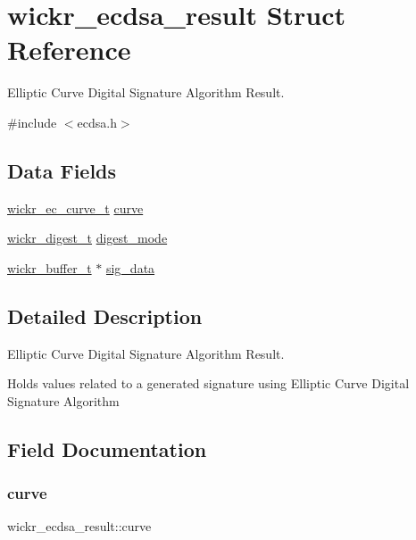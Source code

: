 \hypertarget{structwickr__ecdsa__result}{}\section{wickr\+\_\+ecdsa\+\_\+result Struct Reference}
\label{structwickr__ecdsa__result}


Elliptic Curve Digital Signature Algorithm Result.  




{\ttfamily \#include $<$ecdsa.\+h$>$}

\subsection*{Data Fields}
\begin{DoxyCompactItemize}
\item 
\mbox{\hyperlink{structwickr__ec__curve}{wickr\+\_\+ec\+\_\+curve\+\_\+t}} \mbox{\hyperlink{structwickr__ecdsa__result_a76bcae0ea46e0f99bfd8fb70aac165bb}{curve}}
\item 
\mbox{\hyperlink{structwickr__digest}{wickr\+\_\+digest\+\_\+t}} \mbox{\hyperlink{structwickr__ecdsa__result_a33c820900693a016ac43702e76b54cff}{digest\+\_\+mode}}
\item 
\mbox{\hyperlink{structwickr__buffer}{wickr\+\_\+buffer\+\_\+t}} $\ast$ \mbox{\hyperlink{structwickr__ecdsa__result_ada32a17d9f713f84142fc6a338ebcc48}{sig\+\_\+data}}
\end{DoxyCompactItemize}


\subsection{Detailed Description}
Elliptic Curve Digital Signature Algorithm Result. 

Holds values related to a generated signature using Elliptic Curve Digital Signature Algorithm 

\subsection{Field Documentation}
\mbox{\label{structwickr__ecdsa__result_a76bcae0ea46e0f99bfd8fb70aac165bb}} 
\subsubsection{\texorpdfstring{curve}{curve}}
{\footnotesize\ttfamily wickr\+\_\+ecdsa\+\_\+result\+::curve}

